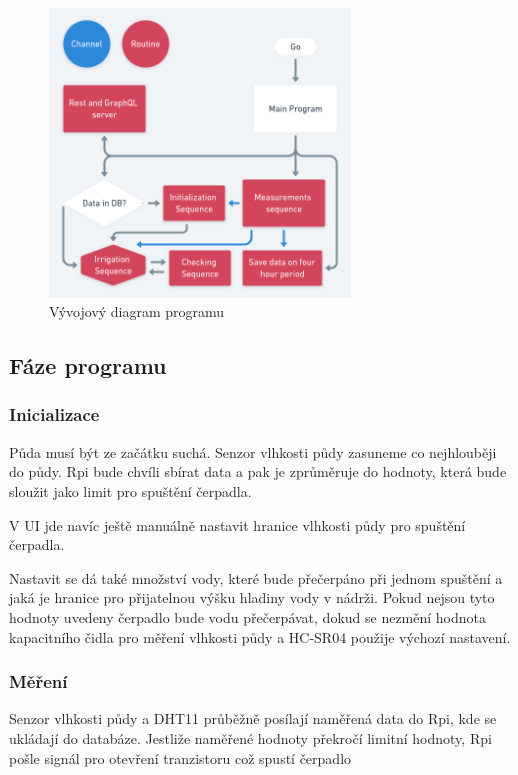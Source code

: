 \documentclass[11pt,a4paper]{article}
\begin{document}
\begin{figure}[h]
	\centering
	\includegraphics[width=8cm]{go.png}
	\caption{Vývojový diagram programu}
\end{figure}

\subsection{Fáze programu}

\subsubsection{Inicializace}

Půda musí být ze začátku suchá. Senzor vlhkosti půdy zasuneme co nejhlouběji do
půdy. Rpi bude chvíli sbírat data a pak je zprůměruje do hodnoty, která bude
sloužit jako limit pro spuštění čerpadla.

V UI jde navíc ještě manuálně nastavit hranice vlhkosti půdy pro spuštění
čerpadla.

Nastavit se dá také množství vody, které bude přečerpáno při jednom spuštění a
jaká je hranice pro přijatelnou výšku hladiny vody v nádrži. Pokud nejsou tyto
hodnoty uvedeny čerpadlo bude vodu přečerpávat, dokud se nezmění hodnota
kapacitního čidla pro měření vlhkosti půdy a HC-SR04 použije výchozí nastavení.

\subsubsection{Měření}

Senzor vlhkosti půdy a DHT11 průběžně posílají naměřená data do Rpi, kde se
ukládají do databáze. Jestliže naměřené hodnoty překročí limitní hodnoty, Rpi
pošle signál pro otevření tranzistoru což spustí čerpadlo
\end{document}
